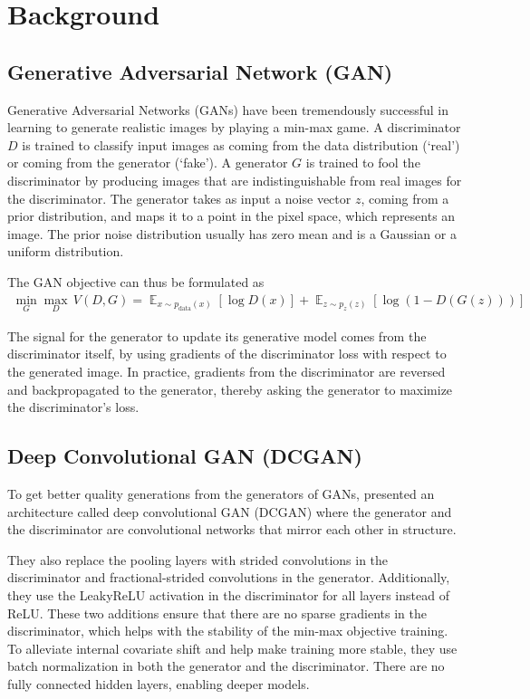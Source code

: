 \documentclass{article}
\DeclareMathOperator*{\E}{\mathbb{E}}
\begin{document}
\section{Background}

\subsection{Generative Adversarial Network (GAN)}

Generative Adversarial Networks (GANs) \cite{gan} have been tremendously successful in learning to generate realistic images by playing a min-max game. A discriminator $D$ is trained to classify input images as coming from the data distribution (`real') or coming from the generator (`fake'). A generator $G$ is trained to fool the discriminator by producing images that are indistinguishable from real images for the discriminator. The generator takes as input a noise vector $z$, coming from a prior distribution, and maps it to a point in the pixel space, which represents an image. The prior noise distribution usually has zero mean and is a Gaussian or a uniform distribution.

The GAN objective can thus be formulated as
\begin{align}
\min_G \max_D\, V(D,G) = \E_{x \sim p_{\text{data}}(x)}\left[\log D(x)\right] + \E_{z\sim p_z(z)}\left[\log(1-D(G(z)))\right] \label{eq:gan}
\end{align}

The signal for the generator to update its generative model comes from the discriminator itself, by using gradients of the discriminator loss with respect to the generated image. In practice, gradients from the discriminator are reversed and backpropagated to the generator, thereby asking the generator to maximize the discriminator's loss.


\subsection{Deep Convolutional GAN (DCGAN)}

To get better quality generations from the generators of GANs, \cite{dcgan} presented an architecture called deep convolutional GAN (DCGAN) where the generator and the discriminator are convolutional networks that mirror each other in structure.

They also replace the pooling layers with strided convolutions in the discriminator and fractional-strided convolutions in the generator. Additionally, they use the LeakyReLU activation in the discriminator for all layers instead of ReLU. These two additions ensure that there are no sparse gradients in the discriminator, which helps with the stability of the min-max objective training. To alleviate internal covariate shift and help make training more stable, they use batch normalization \cite{batchnorm} in both the generator and the discriminator. There are no fully connected hidden layers, enabling deeper models.
\end{document}

